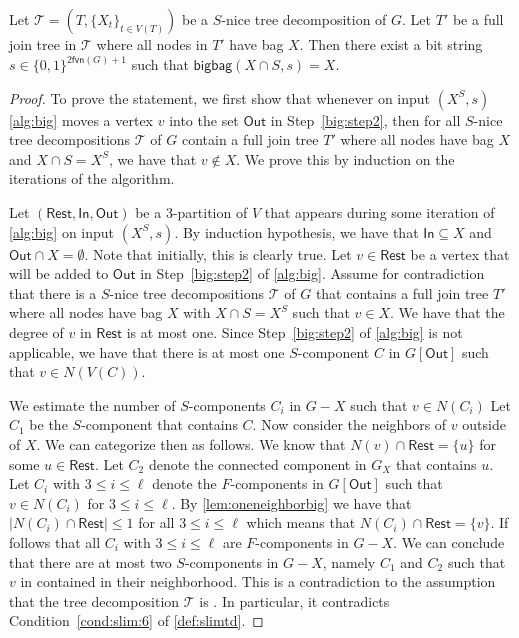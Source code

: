 \documentclass[a4paper,UKenglish,cleveref, autoref, thm-restate, numberwithinsect]{lipics-v2021}
\newcounter{algorithm}
\newcommand{\fvn}{\mathsf{fvn}}
\newcommand{\bigbag}{\mathsf{bigbag}}
\newcommand{\slim}{\text{slim}\xspace}
\newcommand{\In}{\mathsf{In}}
\newcommand{\Out}{\mathsf{Out}}
\newcommand{\Rest}{\mathsf{Rest}}
\begin{document}
\begin{lemma}\label{lem:bigcorrect1}
Let $\mathcal{T}=(T,\{X_t\}_{t\in V(T)})$ be a \slim $S$-nice tree decomposition of $G$. Let $T'$ be a full join tree in $\mathcal{T}$ where all nodes in $T'$ have bag $X$. Then there exist a bit string $s\in \{0,1\}^{2\fvn(G)+1}$ such that $\bigbag(X\cap S,s)=X$.
\end{lemma}
\begin{proof}
To prove the statement, we first show that whenever on input $(X^S,s)$ \cref{alg:big} moves a vertex $v$ into the set $\Out$ in Step~\ref{big:step2}, then for all \slim $S$-nice tree decompositions $\mathcal{T}$ of $G$ contain a full join tree $T'$ where all nodes have bag $X$ and $X\cap S=X^S$, we have that $v\notin X$. We prove this by induction on the iterations of the algorithm.

Let $(\Rest,\In,\Out)$ be a 3-partition of $V$ that appears during some iteration of \cref{alg:big} on input $(X^S,s)$. By induction hypothesis, we have that $\In\subseteq X$ and $\Out\cap X=\emptyset$. Note that initially, this is clearly true.
Let $v\in \Rest$ be a vertex that will be added to $\Out$ in Step~\ref{big:step2} of \cref{alg:big}.
Assume for contradiction that there is a \slim $S$-nice tree decompositions $\mathcal{T}$ of $G$ that contains a full join tree $T'$ where all nodes have bag $X$ with $X\cap S=X^S$ such that $v\in X$. We have that the degree of $v$ in $\Rest$ is at most one. Since Step~\ref{big:step2} of \cref{alg:big} is not applicable, we have that there is at most one $S$-component $C$ in $G[\Out]$ such that $v\in N(V(C))$.

We estimate the number of $S$-components $C_i$ in $G-X$ such that $v\in N(C_i)$ Let $C_1$ be the $S$-component that contains $C$. Now consider the neighbors of $v$ outside of $X$. We can categorize then as follows. We know that $N(v)\cap\Rest=\{u\}$ for some $u\in \Rest$. Let $C_2$ denote the connected component in $G_X$ that contains $u$. Let $C_i$ with $3\le i\le\ell$ denote the $F$-components in $G[\Out]$ such that $v\in N(C_i)$ for $3\le i\le\ell$. By \cref{lem:oneneighborbig} we have that $|N(C_i)\cap \Rest|\le 1$ for all $3\le i\le\ell$ which means that $N(C_i)\cap \Rest=\{v\}$. If follows that all $C_i$ with $3\le i\le\ell$ are $F$-components in $G-X$. We can conclude that there are at most two $S$-components in $G-X$, namely $C_1$ and $C_2$ such that $v$ in contained in their neighborhood. This is a contradiction to the assumption that the tree decomposition $\mathcal{T}$ is \slim. In particular, it contradicts Condition~\ref{cond:slim:6} of \cref{def:slimtd}.


\end{proof}
\end{document}
